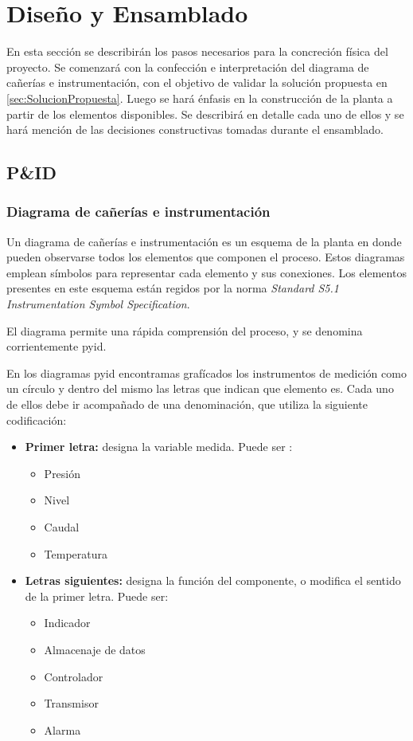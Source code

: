 \chapter{Diseño y Ensamblado}
\label{ch:DisenoEnsamblado}

En esta sección se describirán los pasos necesarios para la concreción física
del proyecto.
Se comenzará con la confección e interpretación del diagrama de cañerías e
instrumentación, con el objetivo de validar la solución propuesta en
\ref{sec:SolucionPropuesta}.
Luego se hará énfasis en la construcción de la planta a partir de los elementos
disponibles.
Se describirá en detalle cada uno de ellos y se hará mención de
las decisiones constructivas tomadas durante el ensamblado.

\section{P\&ID}
\label{sec:p&id}

\subsection{Diagrama de cañerías e instrumentación}
Un diagrama de cañerías e instrumentación es un esquema de la planta en donde
pueden observarse todos los elementos que componen el proceso.
Estos diagramas emplean símbolos para representar cada elemento y sus
conexiones.
Los elementos presentes en este esquema están regidos por la norma
\emph{Standard S5.1 Instrumentation Symbol Specification}.

El diagrama permite una rápida comprensión del proceso, y se denomina
corrientemente \gls{pyid}.

En los diagramas \gls{pyid} encontramas grafícados los instrumentos de medición 
como un círculo y dentro del mismo las letras que indican que elemento es. Cada 
uno de ellos debe ir acompañado de una denominación, que utiliza la
siguiente codificación:

\begin{itemize}  
 \item \textbf{Primer letra:}
 designa la variable medida. Puede ser :
 \begin{itemize}
  \item Presión
  \item Nivel
  \item Caudal
  \item Temperatura
 \end{itemize}

 \item \textbf{Letras siguientes:}
 designa la función del componente, o modifica el sentido de la primer letra.
 Puede ser:
 \begin{itemize}
  \item Indicador
  \item Almacenaje de datos
  \item Controlador
  \item Transmisor
  \item Alarma
 \end{itemize}
\end{itemize}

